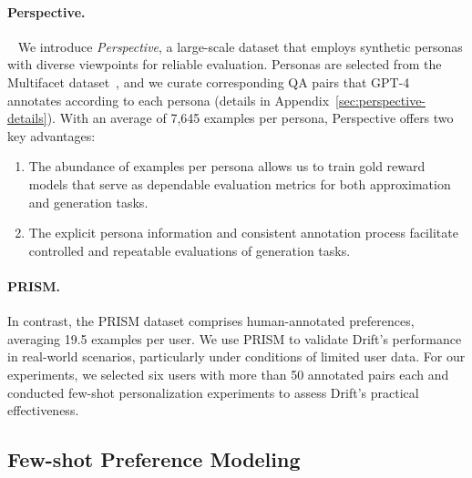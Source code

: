 \paragraph{Perspective.}~\label{sec:perspective-advantages}
We introduce \textit{Perspective}, a large-scale dataset that employs synthetic personas with diverse viewpoints for reliable evaluation. Personas are selected from the Multifacet dataset~\citep{multifacet}, and we curate corresponding QA pairs that GPT-4 annotates according to each persona (details in Appendix~\ref{sec:perspective-details}). With an average of 7,645 examples per persona, Perspective offers two key advantages:
\begin{enumerate} 
\item The abundance of examples per persona allows us to train gold reward models that serve as dependable evaluation metrics for both approximation and generation tasks. 
\item The explicit persona information and consistent annotation process facilitate controlled and repeatable evaluations of generation tasks. 
\end{enumerate}

\paragraph{PRISM.}
In contrast, the PRISM dataset comprises human-annotated preferences, averaging 19.5 examples per user. We use PRISM to validate Drift’s performance in real-world scenarios, particularly under conditions of limited user data. For our experiments, we selected six users with more than 50 annotated pairs each and conducted few-shot personalization experiments to assess Drift's practical effectiveness.

\subsection{Few-shot Preference Modeling}

